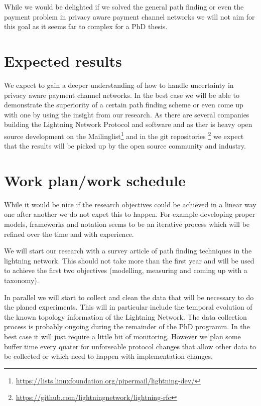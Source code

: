 \documentclass[a4paper]{paper}
\begin{document}
While we would be delighted if we solved the general path finding or even the payment problem in privacy aware payment channel networks we will not aim for this goal as it seems far to complex for a PhD thesis.


\section{Expected results}
We expect to gain a deeper understanding of how to handle uncertainty in privacy aware payment channel networks.
In the best case we will be able to demonstrate the superiority of a certain path finding scheme or even come up with one by using the insight from our research.
As there are several companies building the Lightning Network Protocol and software and as ther is heavy open source development on the Mailinglist\footnote{\url{https://lists.linuxfoundation.org/pipermail/lightning-dev/}} and in the git repositories \footnote{\url{https://github.com/lightningnetwork/lightning-rfc}} we expect that the results will be picked up by the open source community and industry.

\section{Work plan/work schedule}



While it would be nice if the research objectives could be achieved in a linear way one after another we do not expet this to happen.
For example developing proper models, frameworks and notation seems to be an iterative process which will be refined over the time and with experience.

We will start our research with a survey article of path finding techniques in the lightning network.
This should not take more than the first year and will be used to achieve the first two objectives (modelling, measuring and coming up with a taxonomy).

In parallel we will start to collect and clean the data that will be necessary to do the planed experiments.
This will in particular include the temporal evolution of the known topology information of the Lightning Network.
The data collection process is probably ongoing during the remainder of the PhD programm.
In the best case it will just require a little bit of monitoring.
However we plan some buffer time every quater for unforseable protocol changes that allow other data to be collected or which need to happen with implementation changes.
\end{document}
